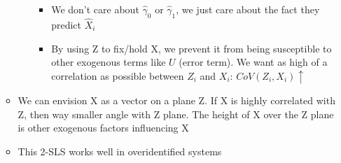 \documentclass[10pt, oneside]{article}
\begin{document}
\begin{itemize}
\begin{itemize}
\begin{itemize}
\begin{itemize}
                \item We don't care about $\hat \gamma_0$ or $\hat \gamma_1$, we just care about the fact they predict $\hat X_i$
                \item By using Z to fix/hold X, we prevent it from being susceptible to other exogenous terms like $U$ (error term). We want as high of a correlation as possible between $Z_i$ and $X_i$: $CoV(Z_i, X_i)\uparrow$
            \end{itemize}
        \end{itemize}
        \item We can envision X as a vector on a plane Z. If X is highly correlated with Z, then way smaller angle with Z plane. The height of X over the Z plane is other exogenous factors influencing X
        \item This 2-SLS works well in overidentified systems
    \end{itemize}
\end{itemize}


\end{document}
